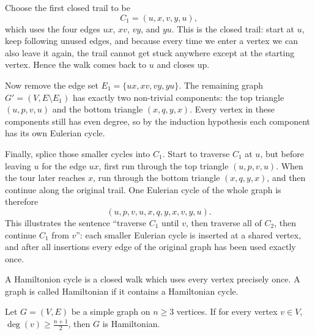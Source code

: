 \documentclass[11pt, a4paper]{ctexrep}
\begin{document}
\begin{example}
    Choose the first closed trail to be
    \[
        C_1 = (u,x,v,y,u),
    \]
    which uses the four edges $ux$, $xv$, $vy$, and $yu$. This is the closed trail: start at $u$, keep following unused edges, and because every time we enter a vertex we can also leave it again, the trail cannot get stuck anywhere except at the starting vertex. Hence the walk comes back to $u$ and closes up.

    Now remove the edge set $E_1 = \{ux, xv, vy, yu\}$. The remaining graph $G' = (V, E \setminus E_1)$ has exactly two non-trivial components: the top triangle $(u,p,v,u)$ and the bottom triangle $(x,q,y,x)$. Every vertex in these components still has even degree, so by the induction hypothesis each component has its own Eulerian cycle.

    Finally, splice those smaller cycles into $C_1$. Start to traverse $C_1$ at $u$, but before leaving $u$ for the edge $ux$, first run through the top triangle $(u,p,v,u)$. When the tour later reaches $x$, run through the bottom triangle $(x,q,y,x)$, and then continue along the original trail. One Eulerian cycle of the whole graph is therefore
    \[
        (u,p,v,u,x,q,y,x,v,y,u).
    \]
    This illustrates the sentence ``traverse $C_1$ until $v$, then traverse all of $C_2$, then continue $C_1$ from $v$'': each smaller Eulerian cycle is inserted at a shared vertex, and after all insertions every edge of the original graph has been used exactly once.
\end{example}

\begin{definition}
    A Hamiltonion cycle is a closed walk which uses every vertex precisely once. A graph is called Hamiltonian if it contains a Hamiltonian cycle.
\end{definition}

\begin{theorem}
    Let $G = (V, E)$ be a simple graph on $n \ge 3$ vertices. If for every vertex $v \in V$, $\deg(v) \ge \frac{n+1}{2}$, then $G$ is Hamiltonian.
\end{theorem}
\end{document}
